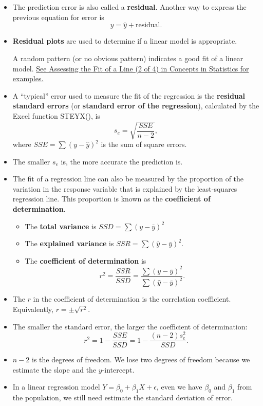 \begin{itemize}
\item
  The prediction error is also called a \textbf{residual}. Another way
  to express the previous equation for error is
  \[y=\hat{y}+\text{residual}.\]
\item
  \textbf{Residual plots} are used to determine if a linear model is
  appropriate.

  A random pattern (or no obvious pattern) indicates a good fit of a
  linear model.
  \href{https://courses.lumenlearning.com/wmopen-concepts-statistics/chapter/assessing-the-fit-of-a-line-2-of-4/}{See
  Assessing the Fit of a Line (2 of 4) in Concepts in Statistics for
  examples.}
\item
  A ``typical'' error used to measure the fit of the regression is the
  \textbf{residual standard errors} (or \textbf{standard error of the
  regression}), calculated by the Excel function \textsf{STEYX()}, is
  \[s_e=\sqrt{\dfrac{SSE}{n-2}},\] where \(SSE=\sum (y-\hat{y})^2\) is
  the sum of square errors.
\item
  The smaller \(s_e\) is, the more accurate the prediction is.
\item
  The fit of a regression line can also be measured by the proportion of
  the variation in the response variable that is explained by the
  least-squares regression line. This proportion is known as the
  \textbf{coefficient of determination}.

  \begin{itemize}
  \item
    The \textbf{total variance} is \(SSD=\sum(y-\bar{y})^2\)
  \item
    The \textbf{explained variance} is \(SSR=\sum(\hat{y}-\bar{y})^2\).
  \item
    The \textbf{coefficient of determination} is
    \[r^2=\dfrac{SSR}{SSD}=\dfrac{\sum(y-\bar{y})^2}{\sum(\hat{y}-\bar{y})^2}.\]
  \end{itemize}
\end{itemize}

\begin{remark}

\begin{itemize}
\item
  The \(r\) in the coefficient of determination is the correlation
  coefficient. Equivalently, \(r=\pm\sqrt{r^2}\).
\item
  The smaller the standard error, the larger the coefficient of
  determination: \[r^2=1-\dfrac{SSE}{SSD}=1-\dfrac{(n-2)s_e^2}{SSD}.\]
\item
  \(n-2\) is the degrees of freedom. We lose two degrees of freedom
  because we estimate the slope and the \(y\)-intercept.
\item
  In a linear regression model \(Y=\beta_0 + \beta_1 X +\epsilon\), even
  we have \(\beta_0\) and \(\beta_1\) from the population, we still need
  estimate the standard deviation of error.
\end{itemize}

\end{remark}

